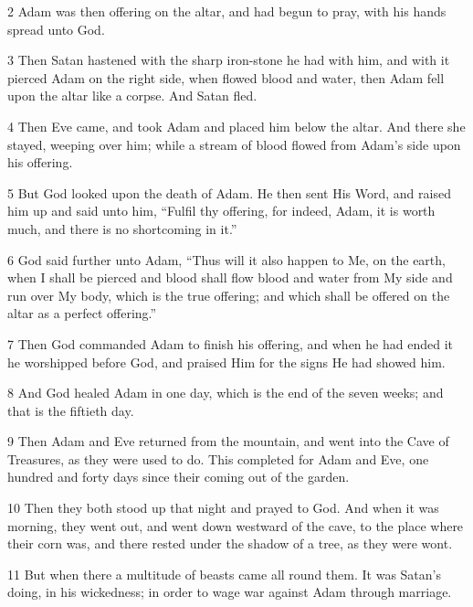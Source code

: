 \par 2 Adam was then offering on the altar, and had begun to pray, with his hands spread unto God.

\par 3 Then Satan hastened with the sharp iron-stone he had with him, and with it pierced Adam on the right side, when flowed blood and water, then Adam fell upon the altar like a corpse. And Satan fled.

\par 4 Then Eve came, and took Adam and placed him below the altar. And there she stayed, weeping over him; while a stream of blood flowed from Adam's side upon his offering.

\par 5 But God looked upon the death of Adam. He then sent His Word, and raised him up and said unto him, “Fulfil thy offering, for indeed, Adam, it is worth much, and there is no shortcoming in it.”

\par 6 God said further unto Adam, “Thus will it also happen to Me, on the earth, when I shall be pierced and blood shall flow blood and water from My side and run over My body, which is the true offering; and which shall be offered on the altar as a perfect offering.”

\par 7 Then God commanded Adam to finish his offering, and when he had ended it he worshipped before God, and praised Him for the signs He had showed him.

\par 8 And God healed Adam in one day, which is the end of the seven weeks; and that is the fiftieth day.

\par 9 Then Adam and Eve returned from the mountain, and went into the Cave of Treasures, as they were used to do. This completed for Adam and Eve, one hundred and forty days since their coming out of the garden.

\par 10 Then they both stood up that night and prayed to God. And when it was morning, they went out, and went down westward of the cave, to the place where their corn was, and there rested under the shadow of a tree, as they were wont.

\par 11 But when there a multitude of beasts came all round them. It was Satan's doing, in his wickedness; in order to wage war against Adam through marriage.

